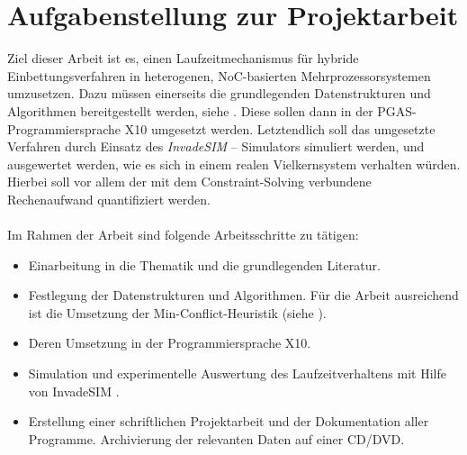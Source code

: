 \chapter*{Aufgabenstellung zur Projektarbeit}\label{aufgabenstellung}
Ziel dieser Arbeit ist es, einen Laufzeitmechanismus für hybride
Einbettungsverfahren in heterogenen, NoC-basierten Mehrprozessorsystemen
umzusetzen. Dazu müssen einerseits die grundlegenden Datenstrukturen und
Algorithmen bereitgestellt werden, siehe \cite{jaeger}. Diese sollen dann in der PGAS-Programmiersprache
X10 \cite{x10} umgesetzt werden. Letztendlich soll das umgesetzte
Verfahren durch Einsatz des \textit{InvadeSIM} -- Simulators \cite{cf:MPSoCs} simuliert werden,
und ausgewertet werden, wie es sich in einem realen Vielkernsystem verhalten
würden. Hierbei soll vor allem der mit dem Constraint-Solving verbundene Rechenaufwand
quantifiziert werden.
\\
\\
Im Rahmen der Arbeit sind folgende Arbeitsschritte zu tätigen:
\begin{itemize}
\item Einarbeitung in die Thematik und die grundlegenden Literatur.
\item Festlegung der Datenstrukturen und Algorithmen. Für die Arbeit ausreichend ist die Umsetzung der Min-Conflict-Heuristik (siehe \cite{jaeger}).
\item Deren Umsetzung in der Programmiersprache X10.
\item Simulation und experimentelle Auswertung des Laufzeitverhaltens mit Hilfe von InvadeSIM \cite{cf:MPSoCs}.
\item Erstellung einer schriftlichen Projektarbeit und der Dokumentation aller Programme. Archivierung der relevanten Daten auf einer CD/DVD.
\end{itemize}